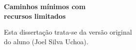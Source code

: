 \documentclass[12pt,twoside,a4paper]{book}
\begin{document}
\newpage
\thispagestyle{empty}
   \begin{center}
        \vspace*{2.3 cm}
        \textbf{\Large{Caminhos mínimos com\\
                       recursos limitados}}\\
        \vspace*{2 cm}
    \end{center}

    \vskip 2cm

    \begin{flushright}
	Esta dissertação trata-se da versão original\\
  do aluno (Joel Silva Uchoa).
    \end{flushright}

\pagebreak


%





    
\end{document}

